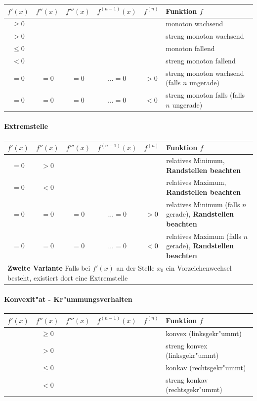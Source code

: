 	\begin{tabular}{|c|c|c|c|c|l|}
		\hline $f'(x)$ & $f''(x)$ & $f'''(x)$ & $f^{(n-1)}(x)$ & $f^{(n)}$ & Funktion $f$ \\
		\hline $\geq 0$ & & & & & monoton wachsend\\
		\hline $> 0$ & & & & & streng monoton wachsend\\
		\hline $\leq 0$ & & & & & monoton fallend \\
		\hline $< 0$ & & & & & streng monoton fallend\\
		\hline $= 0$ & $= 0$ & $= 0$ & $\dots = 0$ & $> 0$ & streng monoton wachsend (falls $n$ ungerade)\\
		\hline $= 0$ & $= 0$ & $= 0$ & $\dots = 0$ & $< 0$ & streng monoton falls (falls $n$ ungerade) \\\hline
	\end{tabular}

\paragraph{Extremstelle}
	\begin{tabular}{|c|c|c|c|c|l|}
		\hline $f'(x)$ & $f''(x)$ & $f'''(x)$ & $f^{(n-1)}(x)$ & $f^{(n)}$ & Funktion $f$ \\
		\hline $= 0$ & $> 0$ & & & & relatives Minimum, \textbf{Randstellen beachten}\\
		\hline $= 0$ & $< 0$ & & & & relatives Maximum, \textbf{Randstellen beachten}\\
		\hline $= 0$ & $= 0$ & $= 0$ & $\dots = 0$ & $> 0$ & relatives Minimum (falls $n$ gerade), \textbf{Randstellen beachten}\\
		\hline $= 0$ & $= 0$ & $= 0$ & $\dots = 0$ & $< 0$ & relatives Maximum (falls $n$ gerade), \textbf{Randstellen beachten}\\
		\hline\multicolumn{6}{|l|}{\textbf{Zweite Variante}  Falls bei $f'(x)$ an der Stelle $x_0$ ein Vorzeichenwechsel besteht, existiert dort eine Extremstelle} \\\hline
	\end{tabular}

\paragraph{Konvexit"at - Kr"ummungsverhalten}
	\begin{tabular}{|c|c|c|c|c|l|}
		\hline $f'(x)$ & $f''(x)$ & $f'''(x)$ & $f^{(n-1)}(x)$ & $f^{(n)}$ & Funktion $f$ \\
		\hline & $\geq 0$ & & & & konvex (linksgekr"ummt)\\
		\hline & $> 0$ & & & & streng konvex (linksgekr"ummt)\\
		\hline & $\leq 0$ & & & & konkav (rechtsgekr"ummt)\\
		\hline & $< 0$ & & & & streng konkav (rechtsgekr"ummt)\\\hline
	\end{tabular}

